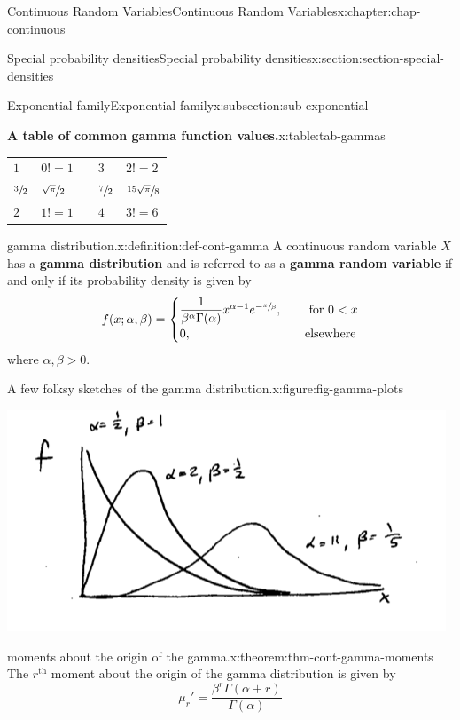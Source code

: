 \documentclass[oneside,10pt,]{book}
\newcommand{\terminology}[1]{\textbf{#1}}
\newcommand{\lt}{<}
\newcommand{\gt}{>}
\newcommand{\amp}{&}
\begin{document}
\begin{chapterptx}{Continuous Random Variables}{}{Continuous Random Variables}{}{}{x:chapter:chap-continuous}
\begin{sectionptx}{Special probability densities}{}{Special probability densities}{}{}{x:section:section-special-densities}
\begin{subsectionptx}{Exponential family}{}{Exponential family}{}{}{x:subsection:sub-exponential}
\begin{tableptx}{\textbf{A table of common gamma function values.}}{x:table:tab-gammas}{}
{\begin{tabular}{lllll}
\(1\)&\(0! = 1\)&&\(3\)&\(2! = 2\)\tabularnewline[0pt]
\(\sfrac{3}{2}\)&\(\sfrac{\sqrt{\pi}}{2}\)&&\(\sfrac{7}{2}\)&\(\sfrac{15\sqrt{\pi}}{8}\)\tabularnewline[0pt]
\(2\)&\(1! = 1\)&&\(4\)&\(3! = 6\)
\end{tabular}
}%
\end{tableptx}%
\begin{definition}{gamma distribution.}{x:definition:def-cont-gamma}%
A continuous random variable \(\displaystyle X\) has a \terminology{gamma distribution} and is referred to as a \terminology{gamma random variable} if and only if its probability density is given by%
\begin{equation*}
f(x; \alpha, \beta) =
\begin{cases}\dfrac{1}{\beta^\alpha
\Gamma(\alpha)}x^{\alpha-1}e^{-\sfrac{x}{\beta}}, \amp \quad \text{
for }0 \lt x\\0, \amp \quad \text{elsewhere}\end{cases}
\end{equation*}
where \(\alpha, \beta \gt 0\).%
\end{definition}
\begin{figureptx}{A few folksy sketches of the gamma distribution.}{x:figure:fig-gamma-plots}{}%
\begin{image}{0.25}{0.5}{0.25}%
\includegraphics[width=\linewidth]{./images/gammas.png}
\end{image}%
\tcblower
\end{figureptx}%
\begin{theorem}{moments about the origin of the gamma.}{}{x:theorem:thm-cont-gamma-moments}%
The \(r^{\text{th}}\) moment about the origin of the gamma distribution is given by%
\begin{equation*}
\mu_r' = \dfrac{\beta^r\Gamma(\alpha+r)}{\Gamma(\alpha)}
\end{equation*}
%
\end{theorem}

\end{subsectionptx}
\end{sectionptx}
\end{chapterptx}
\end{document}

